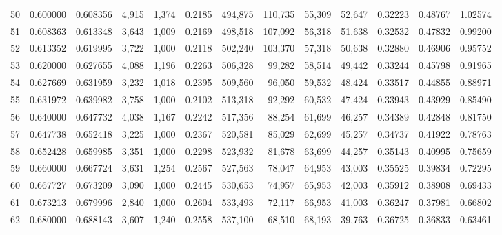 \begin{tabular}{rrrrrrrrrrrrr}
50 &  0.600000 &  0.608356 &   4,915 &  1,374 &                                     0.2185 &  494,875 &  110,735 &   55,309 &   52,647 &  0.32223 &  0.48767 &  1.02574 \\
51 &  0.608363 &  0.613348 &   3,643 &  1,009 &                                     0.2169 &  498,518 &  107,092 &   56,318 &   51,638 &  0.32532 &  0.47832 &  0.99200 \\
52 &  0.613352 &  0.619995 &   3,722 &  1,000 &                                     0.2118 &  502,240 &  103,370 &   57,318 &   50,638 &  0.32880 &  0.46906 &  0.95752 \\
53 &  0.620000 &  0.627655 &   4,088 &  1,196 &                                     0.2263 &  506,328 &   99,282 &   58,514 &   49,442 &  0.33244 &  0.45798 &  0.91965 \\
54 &  0.627669 &  0.631959 &   3,232 &  1,018 &                                     0.2395 &  509,560 &   96,050 &   59,532 &   48,424 &  0.33517 &  0.44855 &  0.88971 \\
55 &  0.631972 &  0.639982 &   3,758 &  1,000 &                                     0.2102 &  513,318 &   92,292 &   60,532 &   47,424 &  0.33943 &  0.43929 &  0.85490 \\
56 &  0.640000 &  0.647732 &   4,038 &  1,167 &                                     0.2242 &  517,356 &   88,254 &   61,699 &   46,257 &  0.34389 &  0.42848 &  0.81750 \\
57 &  0.647738 &  0.652418 &   3,225 &  1,000 &                                     0.2367 &  520,581 &   85,029 &   62,699 &   45,257 &  0.34737 &  0.41922 &  0.78763 \\
58 &  0.652428 &  0.659985 &   3,351 &  1,000 &                                     0.2298 &  523,932 &   81,678 &   63,699 &   44,257 &  0.35143 &  0.40995 &  0.75659 \\
59 &  0.660000 &  0.667724 &   3,631 &  1,254 &                                     0.2567 &  527,563 &   78,047 &   64,953 &   43,003 &  0.35525 &  0.39834 &  0.72295 \\
60 &  0.667727 &  0.673209 &   3,090 &  1,000 &                                     0.2445 &  530,653 &   74,957 &   65,953 &   42,003 &  0.35912 &  0.38908 &  0.69433 \\
61 &  0.673213 &  0.679996 &   2,840 &  1,000 &                                     0.2604 &  533,493 &   72,117 &   66,953 &   41,003 &  0.36247 &  0.37981 &  0.66802 \\
62 &  0.680000 &  0.688143 &   3,607 &  1,240 &                                     0.2558 &  537,100 &   68,510 &   68,193 &   39,763 &  0.36725 &  0.36833 &  0.63461 \\

\end{tabular}
